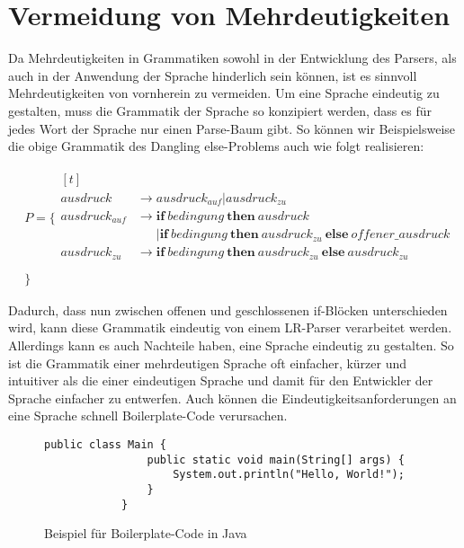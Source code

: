\documentclass[runningheads]{llncs}
\begin{document}
    \section{Vermeidung von Mehrdeutigkeiten}\label{sec:vermeidung-von-mehrdeutigkeiten}

    Da Mehrdeutigkeiten in Grammatiken sowohl in der Entwicklung des Parsers,
    als auch in der Anwendung der Sprache hinderlich sein können,
    ist es sinnvoll Mehrdeutigkeiten von vornherein zu vermeiden.
    Um eine Sprache eindeutig zu gestalten,
    muss die Grammatik der Sprache so konzipiert werden,
    dass es für jedes Wort der Sprache nur einen Parse-Baum gibt.
    So können wir Beispielsweise die obige Grammatik des \glqq Dangling else\grqq{}-Problems auch wie folgt realisieren:

    \begin{align*}
        & P = \{ \begin{aligned}[t]
                     \\
                     ausdruck & \rightarrow ausdruck_{auf} | ausdruck_{zu} \\
                     ausdruck_{auf} & \rightarrow \textbf{if} \ bedingung \ \textbf{then} \ ausdruck \\
                     \phantom{A} & \phantom{\rightarrow} \vert \textbf{if} \ bedingung \ \textbf{then} \ ausdruck_{zu} \ \textbf{else} \ offener\_ausdruck \\
                     ausdruck_{zu} & \rightarrow \textbf{if} \ bedingung \ \textbf{then} \ ausdruck_{zu} \ \textbf{else} \ ausdruck_{zu} \\
        \end{aligned} \\
        & \}
    \end{align*}

    Dadurch, dass nun zwischen offenen und geschlossenen \glqq if\grqq{}-Blöcken unterschieden wird,
    kann diese Grammatik eindeutig von einem LR-Parser verarbeitet werden\cite{abrahams1966association}.
    Allerdings kann es auch Nachteile haben, eine Sprache eindeutig zu gestalten\cite{wharton1976resolution}.
    So ist die Grammatik einer mehrdeutigen Sprache oft einfacher, kürzer und intuitiver als die einer eindeutigen Sprache
    und damit für den Entwickler der Sprache einfacher zu entwerfen.
    Auch können die Eindeutigkeitsanforderungen an eine Sprache schnell Boilerplate-Code verursachen.

    \begin{figure}
        \begin{lstlisting}[style=lstStyle,label={lst:lstlisting3}]
			public class Main {
			    public static void main(String[] args) {
			        System.out.println("Hello, World!");
			    }
			}
        \end{lstlisting}
        \caption{Beispiel für Boilerplate-Code in Java}
        \label{fig:figure4}
    \end{figure}
\end{document}
